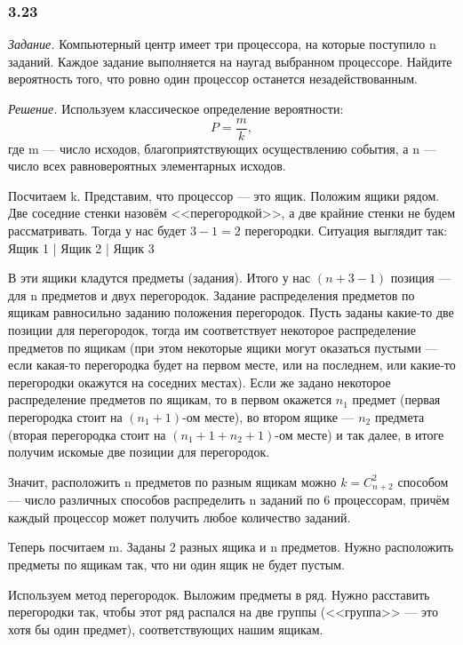 \documentclass{book}
\begin{document}
\subsubsection*{3.23}

\textit{Задание.} Компьютерный центр имеет три процессора, на которые поступило n заданий.
Каждое задание выполняется на наугад выбранном процессоре.
Найдите вероятность того, что ровно один процессор останется незадействованным.

\textit{Решение.} Используем классическое определение вероятности:
$$ P = \frac{m}{k},$$
где m --- число исходов, благоприятствующих осуществлению события, а n --- число всех равновероятных элементарных исходов.

Посчитаем k.
Представим, что процессор --- это ящик.
Положим ящики рядом.
Две соседние стенки назовём <<перегородкой>>, а две крайние стенки не будем рассматривать.
Тогда у нас будет $ 3 - 1 = 2 $ перегородки.
Ситуация выглядит так: Ящик 1 | Ящик 2 | Ящик 3

В эти ящики кладутся предметы (задания).
Итого у нас $ \left( n + 3 - 1 \right) $ позиция --- для n предметов и двух перегородок.
Задание распределения предметов по ящикам равносильно заданию положения перегородок.
Пусть заданы какие-то две позиции для перегородок,
тогда им соответствует некоторое распределение предметов по ящикам
(при этом некоторые ящики могут оказаться пустыми ---
если какая-то перегородка будет на первом месте,
или на последнем, или какие-то перегородки окажутся на соседних местах).
Если же задано некоторое распределение предметов по ящикам,
то в первом окажется $ n_1 $  предмет
(первая перегородка стоит на
$ \left( n_1 + 1 \right) $-ом месте),
во втором ящике --- $ n_2 $ предмета
(вторая перегородка стоит на
$ \left( n_1 + 1 + n_2 +1 \right) $-ом месте)
и так далее, в итоге получим искомые две позиции для перегородок.

Значит, расположить n предметов по разным ящикам можно
$ k = C_{n+2}^{2} $ способом ---
число различных способов распределить n заданий по 6 процессорам,
причём каждый процессор может получить любое количество заданий.

Теперь посчитаем m.
Заданы 2 разных ящика и n предметов.
Нужно расположить предметы по ящикам так, что ни один ящик не будет пустым.

Используем метод перегородок.
Выложим предметы в ряд.
Нужно расставить перегородки так,
чтобы этот ряд распался на две группы (<<группа>> --- это хотя бы один предмет), соответствующих нашим ящикам.
\end{document}
